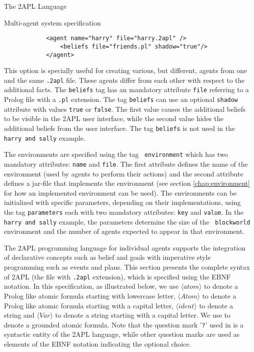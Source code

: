 \begin{chapter}{The 2APL Language}
\begin{section}{Multi-agent system specification}
        \begin{verbatim}
            <agent name="harry" file="harry.2apl" />
                <beliefs file="friends.pl" shadow="true"/>
            </agent>
        \end{verbatim}

        This option is specially useful for
        creating various, but different, agents from one and the same {\tt .2apl}
        file. These agents differ from each other with respect to the additional facts.
        The {\tt beliefs} tag has an mandatory attribute {\tt file}
        referring to a Prolog file with a {\tt .pl} extension. The
        tag {\tt beliefs} can use an optional {\tt shadow}
        attribute with values {\tt true} or {\tt false}. The first
        value causes the additional beliefs to be visible in the 2APL
        user interface, while the second value hides the additional beliefs
        from the user interface. The tag {\tt beliefs} is not used
        in the {\tt harry and sally} example.

        The environments are specified using the tag {\tt
        environment} which has two mandatory attributes: {\tt name} and
        {\tt file}. The first attribute defines the name of the
        environment (used by agents to perform their actions) and
        the second attribute defines a jar-file that implements the
        environment (see section \ref{chap:environment} for how an
        implemented environment can be used). The environments can be initialized with
        specific parameters, depending on their implementations, using
        the tag {\tt parameters} each with two mandatory attributes:
        {\tt key} and {\tt value}. In the {\tt harry and sally}
        example, the parameters determine the size of the {\tt
        blockworld} environment and the number of agents expected to
        appear in that environment.
    \end{section}


    The 2APL programming language for individual agents supports the integration of declarative
    concepts such as belief and goals with imperative style programming such as
    events and plans. This section presents the complete syntax of 2APL (the file
    with {\tt .2apl} extension), which is
    specified using the EBNF notation. In this specification, as illustrated below,
    we use $\langle atom\rangle$ to denote a Prolog like
    atomic formula starting with lowercase letter, $\langle Atom\rangle$ to denote
    a Prolog like atomic formula starting with a capital letter, $\langle
    ident\rangle$ to denote a string and $\langle Var\rangle$ to denote a string
    starting with a capital letter. We use  to denote a grounded
    atomic formula. Note that the question mark '{\tt ?}' used in 
    is a syntactic entity of the 2APL language, while other question marks are
    used as elements of the EBNF notation indicating the optional choice.


\end{chapter}

